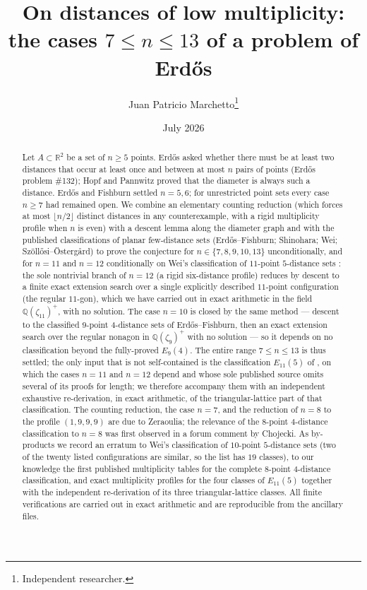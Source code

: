 \documentclass[11pt]{article}
\title{On distances of low multiplicity:\\ the cases $7 \le n \le 13$ of a problem of Erd\H{o}s}
\author{Juan Patricio Marchetto\thanks{Independent researcher.}}
\date{July 2026}
\theoremstyle{definition}
\theoremstyle{remark}
\newcommand{\R}{\mathbb{R}}
\newcommand{\Q}{\mathbb{Q}}
\begin{document}
\maketitle

\begin{abstract}
Let $A \subset \R^2$ be a set of $n \ge 5$ points. Erd\H{o}s asked whether there
must be at least two distances that occur at least once and between at most $n$ pairs of
points (Erd\H{o}s problem \#132); Hopf and Pannwitz proved that the diameter is always such
a distance. Erd\H{o}s and Fishburn settled $n = 5, 6$; for unrestricted point sets every
case $n \ge 7$ had remained open. We combine an elementary counting reduction (which
forces at most $\lfloor n/2 \rfloor$ distinct distances in any counterexample, with a
rigid multiplicity profile when $n$ is even) with a descent lemma along the diameter
graph and with the published classifications of planar few-distance sets
(Erd\H{o}s--Fishburn; Shinohara; Wei; Sz\"oll\H{o}si--\"Osterg\aa rd) to prove the
conjecture for $n \in \{7, 8, 9, 10, 13\}$ unconditionally, and for $n = 11$ and $n = 12$
conditionally on Wei's classification of $11$-point $5$-distance sets \cite{Wei11}: the
sole nontrivial branch of $n = 12$ (a rigid six-distance profile) reduces by descent to a
finite exact extension search over a single explicitly described $11$-point configuration
(the regular $11$-gon), which we have carried out in exact arithmetic in the field
$\Q(\zeta_{11})^+$, with no solution. The case $n = 10$ is closed by the same method ---
descent to the classified $9$-point $4$-distance sets of Erd\H{o}s--Fishburn, then an exact
extension search over the regular nonagon in $\Q(\zeta_9)^+$ with no solution --- so it
depends on no classification beyond the fully-proved $E_9(4)$. The entire range
$7 \le n \le 13$ is thus settled;
the only input that is not self-contained is the classification $E_{11}(5)$ of
\cite{Wei11}, on which the cases $n = 11$ and $n = 12$ depend and whose sole published
source omits several of its proofs for length; we therefore accompany them with an
independent exhaustive re-derivation, in exact arithmetic, of the triangular-lattice part
of that classification. The counting reduction,
the case $n = 7$, and the reduction of $n = 8$ to the profile $(1,9,9,9)$ are due to
Zeraoulia; the relevance of the $8$-point $4$-distance classification to $n = 8$ was first
observed in a forum comment by Chojecki. As by-products we record an erratum to Wei's
classification of $10$-point $5$-distance sets (two of the twenty listed configurations
are similar, so the list has $19$ classes), to our knowledge the first published
multiplicity tables for the complete $8$-point $4$-distance classification, and exact
multiplicity profiles for
the four classes of $E_{11}(5)$ together with the independent re-derivation of its three
triangular-lattice classes. All finite verifications are carried out in exact arithmetic
and are reproducible from the ancillary files.
\end{abstract}
\end{document}
